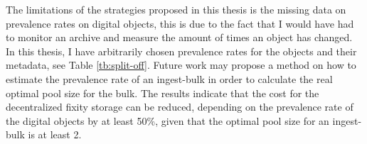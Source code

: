 The limitations of the strategies proposed in this thesis is the missing data on prevalence rates on digital objects, this is due to the fact that I would have had to monitor an archive and measure the amount of times an object has changed. In this thesis, I have arbitrarily chosen prevalence rates for the objects and their metadata, see Table \ref{tb:split-off}. Future work may propose a method on how to estimate the prevalence rate of an ingest-bulk in order to calculate the real optimal pool size for the bulk.
The results indicate that the cost for the decentralized fixity storage can be reduced, depending on the prevalence rate of the digital objects by at least 50\%, given that the optimal pool size for an ingest-bulk is at least 2.